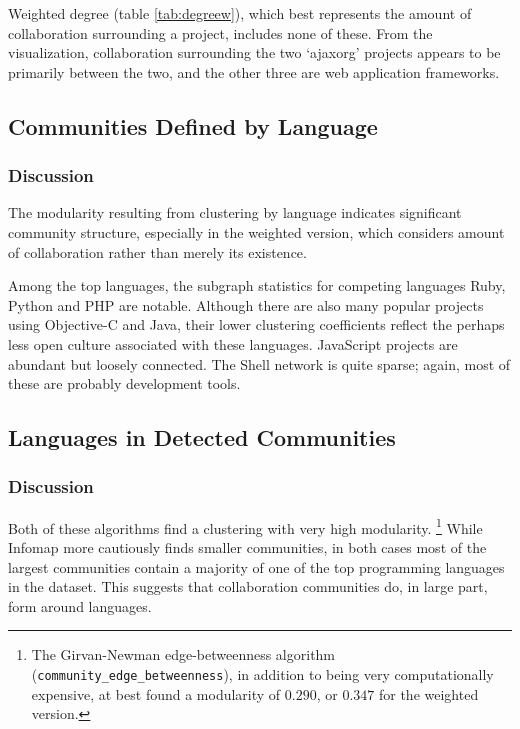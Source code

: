 \documentclass[11pt]{article}
\begin{document}
Weighted degree (table \ref{tab:degreew}), which best represents the amount of
collaboration surrounding a project, includes none of these. From the
visualization, collaboration surrounding the two `ajaxorg' projects appears to
be primarily between the two, and the other three are web application
frameworks.

\subsection{Communities Defined by Language}



\subsubsection{Discussion}
The modularity resulting from clustering by language indicates significant
community structure, especially in the weighted version, which considers amount
of collaboration rather than merely its existence.

Among the top languages, the subgraph statistics for competing languages Ruby,
Python and PHP are notable. Although there are also many popular projects using
Objective-C and Java, their lower clustering coefficients reflect the perhaps
less open culture associated with these languages. JavaScript projects are
abundant but loosely connected. The Shell network is quite sparse; again, most
of these are probably development tools.

\subsection{Languages in Detected Communities}



\subsubsection{Discussion}
Both of these algorithms find a clustering with very high modularity.
\footnote{The Girvan-Newman edge-betweenness algorithm
(\texttt{community\_edge\_betweenness}), in addition to being very
computationally expensive, at best found a modularity of $0.290$, or $0.347$ for
the weighted version.} While Infomap more cautiously finds smaller communities,
in both cases most of the largest communities contain a majority of one of the
top programming languages in the dataset. This suggests that collaboration
communities do, in large part, form around languages.
\end{document}
